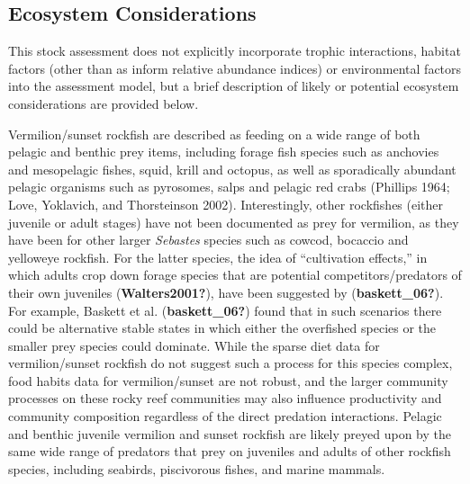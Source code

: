 \documentclass[11pt,
  english,
  a4paper,
]{article}
\begin{document}
\leavevmode\tagmcend\tagstructend\par


\hypertarget{ecosystem-considerations-1}{%
\subsection{Ecosystem Considerations}\label{ecosystem-considerations-1}}

\leavevmode\tagmcend\tagstructend


This stock assessment does not explicitly incorporate trophic interactions, habitat factors (other than as inform relative abundance indices) or environmental factors into the assessment model, but a brief description of likely or potential ecosystem considerations are provided below.

\leavevmode\tagmcend\tagstructend\par


Vermilion/sunset rockfish are described as feeding on a wide range of both pelagic and benthic prey items, including forage fish species such as anchovies and mesopelagic fishes, squid, krill and octopus, as well as sporadically abundant pelagic organisms such as pyrosomes, salps and pelagic red crabs {(Phillips 1964; Love, Yoklavich, and Thorsteinson 2002)\leavevmode\tagmcend\tagstructend}. Interestingly, other rockfishes (either juvenile or adult stages) have not been documented as prey for vermilion, as they have been for other larger \emph{Sebastes} species such as cowcod, bocaccio and yelloweye rockfish. For the latter species, the idea of ``cultivation effects,'' in which adults crop down forage species that are potential competitors/predators of their own juveniles {(\textbf{Walters2001?})\leavevmode\tagmcend\tagstructend}, have been suggested by {(\textbf{baskett\_06?})\leavevmode\tagmcend\tagstructend}. For example, Baskett et al. {(\textbf{baskett\_06?})\leavevmode\tagmcend\tagstructend} found that in such scenarios there could be alternative stable states in which either the overfished species or the smaller prey species could dominate. While the sparse diet data for vermilion/sunset rockfish do not suggest such a process for this species complex, food habits data for vermilion/sunset are not robust, and the larger community processes on these rocky reef communities may also influence productivity and community composition regardless of the direct predation interactions. Pelagic and benthic juvenile vermilion and sunset rockfish are likely preyed upon by the same wide range of predators that prey on juveniles and adults of other rockfish species, including seabirds, piscivorous fishes, and marine mammals.
\end{document}

